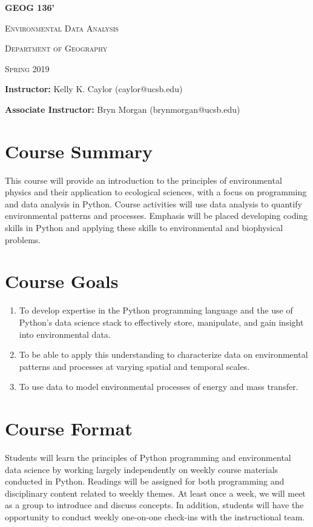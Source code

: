 \documentclass[12pt]{report}
\begin{document}
\begin{center}
\textbf{\textsc{GEOG 136'}}

\textsc{Environmental Data Analysis}

\textsc{Department of Geography}

\textsc{Spring 2019}

\vspace{0.25in}
	\textbf{Instructor:} Kelly K. Caylor (caylor@ucsb.edu)
	
	\textbf{Associate Instructor:} Bryn Morgan (brynmorgan@ucsb.edu)
\end{center}

\section{Course Summary}

This course will provide an introduction to the principles of environmental physics and their application to ecological sciences, with a focus on programming and data analysis in Python. Course activities will use data analysis to quantify environmental patterns and processes. Emphasis will be placed developing coding skills in Python and applying these skills to environmental and biophysical problems.

\section{Course Goals} 
\begin{enumerate}
	
	\item To develop expertise in the Python programming language and the use of  Python’s data science stack to effectively store, manipulate, and gain  insight into environmental data.
	
	\item To be able to apply this understanding to characterize data on environmental patterns and processes at varying spatial and temporal scales.
	
	\item To use data to model environmental processes of energy and mass transfer.
\end{enumerate}

\section{Course Format} 
Students will learn the principles of Python programming and environmental data science by working largely independently on weekly course materials conducted in Python. Readings will be assigned for both programming and disciplinary content related to weekly themes. At least once a week, we will meet as a group to introduce and discuss concepts. In addition, students will have the opportunity to conduct weekly one-on-one check-ins with the instructional team. 
\end{document}
